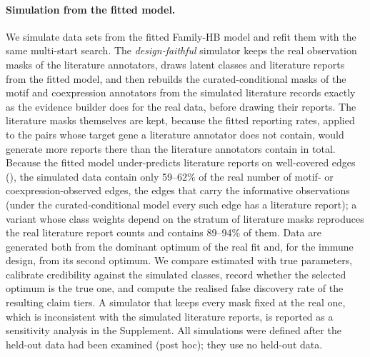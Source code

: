 \documentclass[11pt,a4paper]{article}
\begin{document}
\paragraph{Simulation from the fitted model.} We simulate data sets from the fitted Family-HB model and refit them with the same multi-start search. The \emph{design-faithful} simulator keeps the real observation masks of the literature annotators, draws latent classes and literature reports from the fitted model, and then rebuilds the curated-conditional masks of the motif and coexpression annotators from the simulated literature records exactly as the evidence builder does for the real data, before drawing their reports. The literature masks themselves are kept, because the fitted reporting rates, applied to the pairs whose target gene a literature annotator does not contain, would generate more reports there than the literature annotators contain in total. Because the fitted model under-predicts literature reports on well-covered edges (), the simulated data contain only 59--62\% of the real number of motif- or coexpression-observed edges, the edges that carry the informative observations (under the curated-conditional model every such edge has a literature report); a variant whose class weights depend on the stratum of literature masks reproduces the real literature report counts and contains 89--94\% of them. Data are generated both from the dominant optimum of the real fit and, for the immune design, from its second optimum. We compare estimated with true parameters, calibrate credibility against the simulated classes, record whether the selected optimum is the true one, and compute the realised false discovery rate of the resulting claim tiers. A simulator that keeps every mask fixed at the real one, which is inconsistent with the simulated literature reports, is reported as a sensitivity analysis in the Supplement. All simulations were defined after the held-out data had been examined (post hoc); they use no held-out data.
\end{document}
